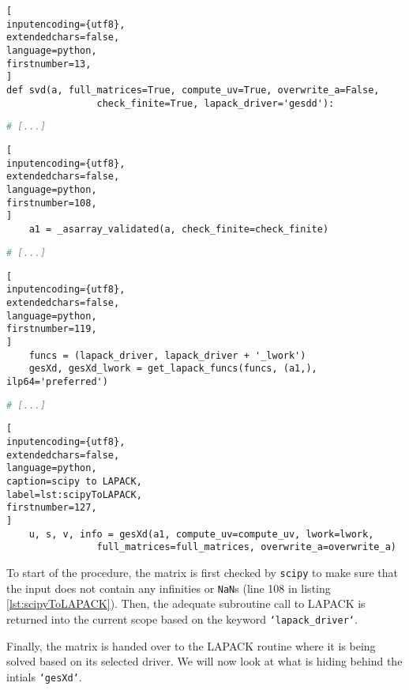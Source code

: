\begin{lstlisting}[
inputencoding={utf8}, 
extendedchars=false, 
language=python,
firstnumber=13,
]
def svd(a, full_matrices=True, compute_uv=True, overwrite_a=False,
        		check_finite=True, lapack_driver='gesdd'):
\end{lstlisting}
%
%
%
\spacingConcatLists
\begin{lstlisting}[language=python, numbers=none]
    # [...]
\end{lstlisting}
%
%
%
\spacingConcatLists
\begin{lstlisting}[
inputencoding={utf8}, 
extendedchars=false, 
language=python,
firstnumber=108,
]
    a1 = _asarray_validated(a, check_finite=check_finite)
\end{lstlisting}
%
%
%
\spacingConcatLists
\begin{lstlisting}[language=python, numbers=none]
    # [...]
\end{lstlisting}
%
%
%
\spacingConcatLists
\begin{lstlisting}[
inputencoding={utf8}, 
extendedchars=false, 
language=python,
firstnumber=119,
]
    funcs = (lapack_driver, lapack_driver + '_lwork')
    gesXd, gesXd_lwork = get_lapack_funcs(funcs, (a1,), ilp64='preferred')
\end{lstlisting}
%
%
%
\spacingConcatLists
\begin{lstlisting}[language=python, numbers=none]
    # [...]
\end{lstlisting}
%
%
%
\spacingConcatLists
\begin{lstlisting}[
inputencoding={utf8}, 
extendedchars=false, 
language=python, 
caption=scipy to LAPACK, 
label=lst:scipyToLAPACK,
firstnumber=127,
]
    u, s, v, info = gesXd(a1, compute_uv=compute_uv, lwork=lwork,
                full_matrices=full_matrices, overwrite_a=overwrite_a)
\end{lstlisting}



\noindent
To start of the procedure, the matrix is first checked by \texttt{scipy} to make sure that the input does not contain any infinities or \texttt{NaN}s (line 108 in listing \ref{lst:scipyToLAPACK}).
Then, the adequate subroutine call to LAPACK is returned into the current scope based on the keyword \texttt{`lapack\_driver`}.

Finally, the matrix is handed over to the LAPACK routine where it is being solved based on its selected driver.
We will now look at what is hiding behind the intials \texttt{`gesXd`}.
\bigskip

